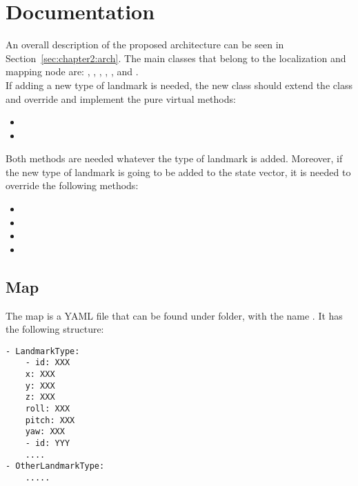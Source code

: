\chapter{Documentation}
\label{appendix:a}

An overall description of the proposed architecture can be seen in Section~\ref{sec:chapter2:arch}. The main classes that belong to the localization and mapping node are: , , , , ,  and .\\

If adding a new type of landmark is needed, the new class should extend the  class and override and implement the pure virtual methods:
\begin{itemize}
    \item {}
    \item {}
\end{itemize}
Both methods are needed whatever the type of landmark is added. Moreover, if the new type of landmark is going to be added to the state vector, it is needed to override the following methods:
\begin{itemize}
    \item {}
    \item {}
    \item {}
    \item {}
\end{itemize}

\section*{Map}
The map is a YAML file that can be found under  folder, with the name . It has the following structure:
\begin{lstlisting}
- LandmarkType:
    - id: XXX
    x: XXX
    y: XXX
    z: XXX
    roll: XXX
    pitch: XXX
    yaw: XXX
    - id: YYY
    ....
- OtherLandmarkType:
    .....

\end{lstlisting}

